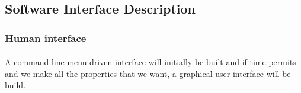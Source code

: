 \documentclass{article}
\begin{document}







\subsection{Software Interface Description}



\subsubsection{Human interface}
\paragraph{}
A command line menu driven interface will initially be built and if time permits and we make all the properties that we want, a graphical user interface will be build.
\end{document}
